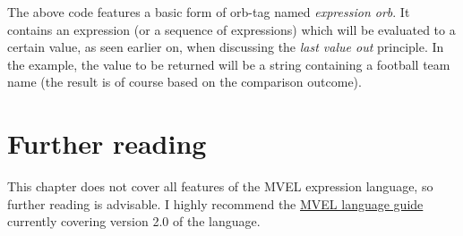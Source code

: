 The above code features a basic form of \gls{orb-tag} named \emph{expression orb}. It contains an expression (or a sequence of expressions) which will be evaluated to a certain value, as seen earlier on, when discussing the \emph{last value out} principle. In the example, the value to be returned will be a string containing a football team name (the result is of course based on the comparison outcome).

\section{Further reading}
\label{sec:mvelfurtherreading}

This chapter does not cover all features of the \gls{MVEL} expression language, so further reading is advisable. I highly recommend the \href{http://mvel.documentnode.com/}{MVEL language guide} currently covering version 2.0 of the language.
